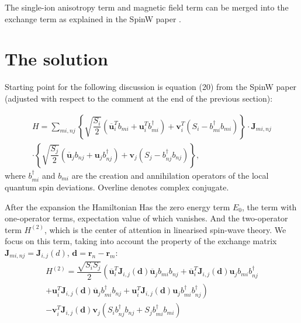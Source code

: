 \documentclass[a4paper,12pt]{article}
\begin{document}
        The single-ion anisotropy term and magnetic field term can be merged into the exchange term as explained in the SpinW paper \cite{toth2015linear}.

    \section{The solution}

    Starting point for the following discussion is equation (20) from the SpinW paper \cite{toth2015linear} 
    (adjusted with respect to the comment at the end of the previous section):

    \begin{multline}
        H = \sum_{mi, nj}\left\{\sqrt{\dfrac{S_{i}}{2}}\left(\overline{\boldsymbol{u}}^T_i b_{mi} + \boldsymbol{u}^T_i b^{\dag}_{mi} \right) + 
        \boldsymbol{v}^T_i(S_i - b^{\dag}_{mi}b_{mi})\right\}  \cdot
        \boldsymbol{J}_{mi, nj}\\
        \cdot\left\{\sqrt{\dfrac{S_{j}}{2}}\left(\overline{\boldsymbol{u}}_j b_{nj} + \boldsymbol{u}_j b^{\dag}_{nj} \right) + 
        \boldsymbol{v}_j(S_j - b^{\dag}_{nj}b_{nj})\right\},
    \end{multline}
    where $b^{\dag}_{mi}$ and $b_{mi}$ are the creation and annihilation operators of the local quantum spin deviations. Overline denotes complex conjugate.

    After the expansion the Hamiltonian Has the zero energy term $E_0$, the term with one-operator terms, expectation value of which vanishes. 
    And the two-operator term $H^{(2)}$, which is the center of attention in linearised spin-wave theory. 
    We focus on this term, taking into account the property of the exchange matrix $\boldsymbol{J}_{mi, nj} = \boldsymbol{J}_{i,j}(d)$, $\boldsymbol{d} = \boldsymbol{r}_n - \boldsymbol{r}_m$:
    \begin{multline}
        H^{(2)} = \dfrac{\sqrt{S_i S_j}}{2}\left(\overline{\boldsymbol{u}}^T_i\boldsymbol{J}_{i,j}(\boldsymbol{d})\overline{\boldsymbol{u}}_jb_{mi}b_{nj} +
        \overline{\boldsymbol{u}}^T_i\boldsymbol{J}_{i,j}(\boldsymbol{d})\boldsymbol{u}_j b_{mi}b^{\dag}_{nj}\right. \\+ 
        \left.\boldsymbol{u}^T_i\boldsymbol{J}_{i,j}(\boldsymbol{d})\overline{\boldsymbol{u}}_jb^{\dag}_{mi}b_{nj} +
        \boldsymbol{u}^T_i\boldsymbol{J}_{i,j}(\boldsymbol{d})\boldsymbol{u}_jb^{\dag}_{mi}b^{\dag}_{nj}\right) \\-
        \boldsymbol{v}^T_i\boldsymbol{J}_{i,j}(\boldsymbol{d})\boldsymbol{v}_j\left(S_ib^{\dag}_{nj}b_{nj} + S_jb^{\dag}_{mi}b_{mi}\right)
    \end{multline}
\end{document}
